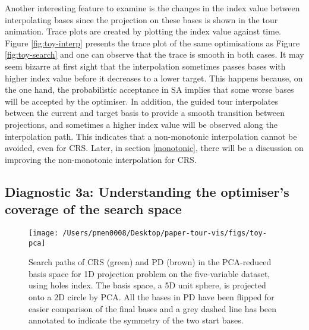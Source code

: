 Another interesting feature to examine is the changes in the index value
between interpolating bases since the projection on these bases is shown
in the tour animation. Trace plots are created by plotting the index
value against time. Figure \ref{fig:toy-interp} presents the trace plot
of the same optimisations as Figure \ref{fig:toy-search} and one can
observe that the trace is smooth in both cases. It may seem bizarre at
first sight that the interpolation sometimes passes bases with higher
index value before it decreases to a lower target. This happens because,
on the one hand, the probabilistic acceptance in SA implies that some
worse bases will be accepted by the optimiser. In addition, the guided
tour interpolates between the current and target basis to provide a
smooth transition between projections, and sometimes a higher index
value will be observed along the interpolation path. This indicates that
a non-monotonic interpolation cannot be avoided, even for CRS. Later, in
section \ref{monotonic}, there will be a discussion on improving the
non-monotonic interpolation for CRS.

\hypertarget{toy-pca}{%
\subsection{Diagnostic 3a: Understanding the optimiser's coverage of the
search space}\label{toy-pca}}

\begin{Schunk}
\begin{figure}

{\centering \texttt{[image: /Users/pmen0008/Desktop/paper-tour-vis/figs/toy-pca]} 

}

\caption[Search paths of CRS (green) and PD (brown) in the PCA-reduced basis space for 1D projection problem on the five-variable dataset,  using holes index]{Search paths of CRS (green) and PD (brown) in the PCA-reduced basis space for 1D projection problem on the five-variable dataset,  using holes index. The basis space, a 5D unit sphere, is projected onto a 2D circle by PCA. All the bases in PD have been flipped for easier comparison of the final bases and a grey dashed line has been annotated to indicate the symmetry of the two start bases.}\label{fig:toy-pca}
\end{figure}
\end{Schunk}

